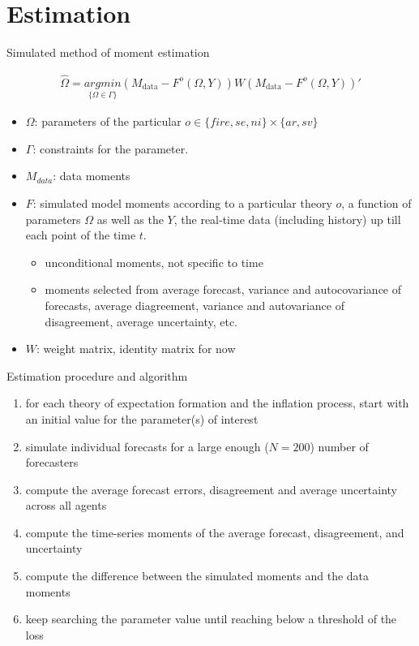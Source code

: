 \documentclass{beamer}
\begin{document}
\section{Estimation}
\begin{frame}{Simulated method of moment estimation}
	
	\begin{eqnarray*}
	\widehat \Omega = \underset{\{\Omega \in \Gamma\} }{argmin} (M_{\textrm{data} } - F^{o}(\Omega, Y)) W  (M_{\textrm{data} } - F^{o}(\Omega, Y))'
	\end{eqnarray*}
	
	\begin{itemize}
		\item  $\Omega$: parameters of the particular $o \in \{{fire}, {se}, {ni} \} \times \{ar, sv\}$
		\item  $\Gamma$: constraints for the parameter. 
		\item $M_{data}$: data moments
		\item $F$: simulated model moments according to a particular theory $o$, a function of parameters $\Omega$ as well as the $Y$, the real-time data (including history) up till each point of the time $t$. 
		\begin{itemize}
			\item unconditional moments, not specific to time
			\item moments selected from average forecast, variance and autocovariance of forecasts, average diagreement, variance and autovariance of disagreement, average uncertainty, etc. 
		\end{itemize}
		\item  $W$: weight matrix, identity matrix for now 
	\end{itemize}
\end{frame}


\begin{frame}{Estimation procedure and algorithm}
	\begin{enumerate}
		\item for each theory of expectation formation and the inflation process, start with an initial value for the parameter(s) of interest
		\item simulate individual forecasts for a large enough ($N=200$) number of forecasters
		\item compute the average forecast errors, disagreement and average uncertainty across all agents
		\item compute the time-series moments of the average forecast, disagreement, and uncertainty
		\item compute the difference between the simulated moments and the data moments 
		\item keep searching the parameter value until reaching below a threshold of the loss
	\end{enumerate}
\end{frame}
\end{document}
